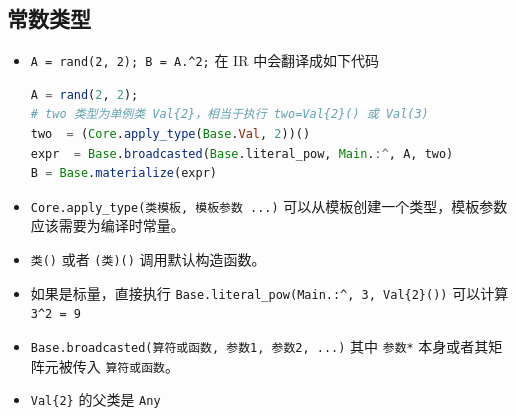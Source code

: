 \subsection{常数类型}
\begin{itemize}
\item \verb`A = rand(2, 2); B = A.^2;` 在 IR 中会翻译成如下代码
\begin{lstlisting}[language=julia]
A = rand(2, 2);
# two 类型为单例类 Val{2}，相当于执行 two=Val{2}() 或 Val(3)
two  = (Core.apply_type(Base.Val, 2))()
expr  = Base.broadcasted(Base.literal_pow, Main.:^, A, two)
B = Base.materialize(expr)
\end{lstlisting}
\item \verb`Core.apply_type(类模板, 模板参数 ...)` 可以从模板创建一个类型，模板参数应该需要为编译时常量。
\item \verb`类()` 或者 \verb`(类)()` 调用默认构造函数。
\item 如果是标量，直接执行 \verb`Base.literal_pow(Main.:^, 3, Val{2}())` 可以计算 \verb`3^2 = 9`
\item \verb`Base.broadcasted(算符或函数, 参数1, 参数2, ...)` 其中 \verb`参数*` 本身或者其矩阵元被传入 \verb`算符或函数`。
\item \verb`Val{2}` 的父类是 \verb`Any`
\end{itemize}

